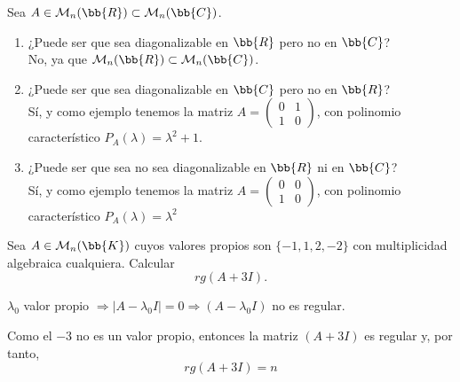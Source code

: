 \begin{ejercicio}
    Sea $A\in \mathcal{M}_n(\bb{R}) \subset \mathcal{M}_n(\bb{C})$.

    \begin{enumerate}
        \item ¿Puede ser que sea diagonalizable en $\bb{R}$ pero no en $\bb{C}$?\\
        No, ya que $\mathcal{M}_n(\bb{R}) \subset \mathcal{M}_n(\bb{C})$.
        
        \item ¿Puede ser que sea diagonalizable en $\bb{C}$ pero no en $\bb{R}$?\\
        Sí, y como ejemplo tenemos la matriz $A=\left(\begin{array}{cc}
            0 & 1 \\
            1 & 0
        \end{array} \right)$, con polinomio característico $P_A(\lambda) = \lambda^2 + 1$.

        \item ¿Puede ser que sea no sea diagonalizable en $\bb{R}$ ni en $\bb{C}$?\\
        Sí, y como ejemplo tenemos la matriz $A=\left(\begin{array}{cc}
            0 & 0 \\
            1 & 0
        \end{array} \right)$, con polinomio característico $P_A(\lambda) = \lambda^2$
    \end{enumerate}
\end{ejercicio}

\begin{ejercicio}
    Sea $A\in \mathcal{M}_n(\bb{K})$ cuyos valores propios son $\{-1,1,2,-2\}$ con multiplicidad algebraica cualquiera. Calcular $$rg(A+3I).$$

    $\lambda_0$ valor propio $\Longrightarrow |A-\lambda_0I| = 0 \Longrightarrow (A-\lambda_0 I)$ no es regular.
    
    Como el $-3$ no es un valor propio, entonces la matriz $(A+3I)$ es regular y, por tanto,
    $$rg(A+3I) = n$$
\end{ejercicio}

